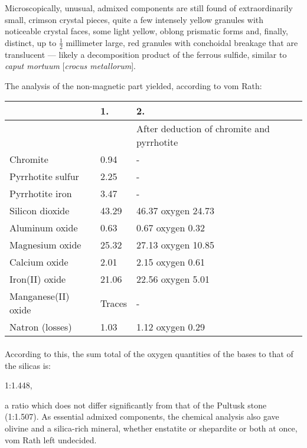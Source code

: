 \documentclass[a4paper, 12pt, oneside]{article}
\begin{document}
Microscopically, unusual, admixed components are still found of extraordinarily small, crimson crystal pieces, quite a few intensely yellow granules with noticeable crystal faces, some light yellow, oblong prismatic forms and, finally, distinct, up to $\frac{1}{2}$ millimeter large, red granules with conchoidal breakage that are translucent --- likely a decomposition product of the ferrous sulfide, similar to \emph{caput mortuum} [\emph{crocus metallorum}].

The analysis of the non-magnetic part yielded, according to vom Rath:
\begin{center}
    \begin{tabular}{ |l|p{1.4cm}|p{3.5cm}| }
        \hline
        & 1. & 2.\\\hline
        & & After deduction of chromite and pyrrhotite\\\hline
        Chromite & 0.94 & -\\\hline
        Pyrrhotite sulfur & 2.25 & -\\\hline
        Pyrrhotite iron & 3.47 & -\\\hline
        Silicon dioxide & 43.29 & 46.37 oxygen 24.73\\\hline
        Aluminum oxide & 0.63 & 0.67 oxygen 0.32\\\hline
        Magnesium oxide & 25.32 & 27.13 oxygen 10.85\\\hline
        Calcium oxide & 2.01 & 2.15 oxygen 0.61\\\hline
        Iron(II) oxide & 21.06 & 22.56 oxygen 5.01\\\hline
        Manganese(II) oxide & Traces & -\\\hline
        Natron (losses) & 1.03 & 1.12 oxygen 0.29\\
        \hline
    \end{tabular}
\end{center}
\paragraph{}
According to this, the sum total of the oxygen quantities of the bases to that of the silicas is:

1:1.448,

a ratio which does not differ significantly from that of the Pultusk stone (1:1.507). As essential admixed components, the chemical analysis also gave olivine and a silica-rich mineral, whether enstatite or shepardite or both at once, vom Rath left undecided.
\end{document}
